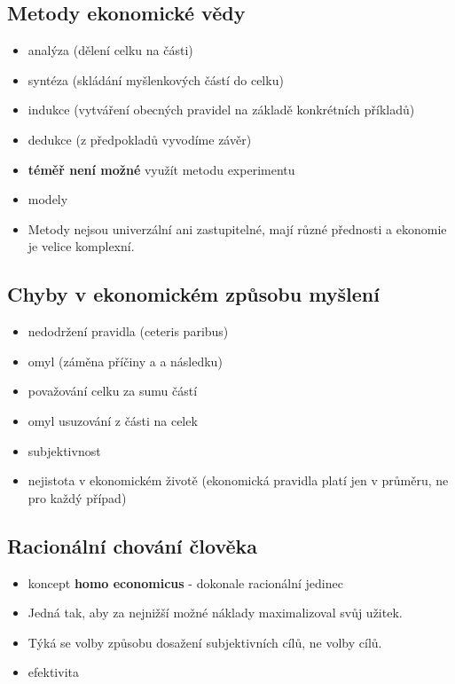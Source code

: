 \subsection{Metody ekonomické vědy}
\begin{itemize}
    \item analýza (dělení celku na části)
    \item syntéza (skládání myšlenkových částí do celku)
    \item indukce (vytváření obecných pravidel na základě konkrétních příkladů)
    \item dedukce (z předpokladů vyvodíme závěr)
    \item \textbf{téměř není možné} využít metodu experimentu
    \item modely
    \item Metody nejsou univerzální ani zastupitelné, mají různé přednosti a ekonomie je velice komplexní.
\end{itemize}

\subsection{Chyby v ekonomickém způsobu myšlení}
\begin{itemize}
    \item nedodržení pravidla  (ceteris paribus)
    \item omyl  (záměna příčiny a a následku)
    \item považování celku za sumu částí
    \item omyl usuzování z části na celek
    \item subjektivnost
    \item nejistota v ekonomickém životě (ekonomická pravidla platí jen v průměru, ne pro každý případ)
\end{itemize}

\subsection{Racionální chování člověka}
\begin{itemize}
    \item koncept \textbf{homo economicus} - dokonale racionální jedinec
    \item Jedná tak, aby za nejnižší možné náklady maximalizoval svůj užitek.
    \item Týká se volby způsobu dosažení subjektivních cílů, ne volby cílů.
    \item efektivita
\end{itemize}

